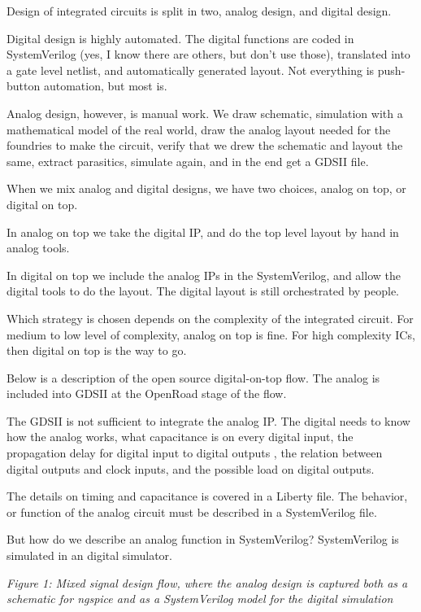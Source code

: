 Design of integrated circuits is split in two, analog design, and
digital design.

Digital design is highly automated. The digital functions are coded in
SystemVerilog (yes, I know there are others, but don't use those),
translated into a gate level netlist, and automatically generated
layout. Not everything is push-button automation, but most is.

Analog design, however, is manual work. We draw schematic, simulation
with a mathematical model of the real world, draw the analog layout
needed for the foundries to make the circuit, verify that we drew the
schematic and layout the same, extract parasitics, simulate again, and
in the end get a GDSII file.

When we mix analog and digital designs, we have two choices, analog on
top, or digital on top.

In analog on top we take the digital IP, and do the top level layout by
hand in analog tools.

In digital on top we include the analog IPs in the SystemVerilog, and
allow the digital tools to do the layout. The digital layout is still
orchestrated by people.

Which strategy is chosen depends on the complexity of the integrated
circuit. For medium to low level of complexity, analog on top is fine.
For high complexity ICs, then digital on top is the way to go.

Below is a description of the open source digital-on-top flow. The
analog is included into GDSII at the OpenRoad stage of the flow.

The GDSII is not sufficient to integrate the analog IP. The digital
needs to know how the analog works, what capacitance is on every digital
input, the propagation delay for digital input to digital outputs , the
relation between digital outputs and clock inputs, and the possible load
on digital outputs.

The details on timing and capacitance is covered in a Liberty file. The
behavior, or function of the analog circuit must be described in a
SystemVerilog file.

But how do we describe an analog function in SystemVerilog?
SystemVerilog is simulated in an digital simulator.


{
\centering
{}
}

\emph{Figure 1: Mixed signal design flow, where the analog design is
captured both as a schematic for ngspice and as a SystemVerilog model
for the digital simulation}

